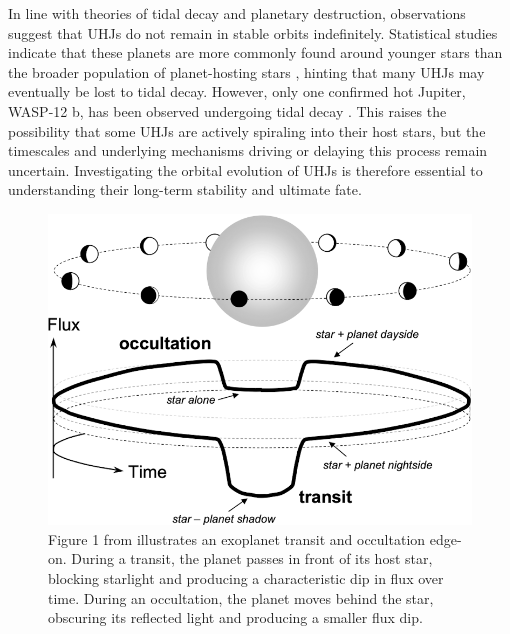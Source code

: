 \documentclass[oneside,12pt]{amsart}
\numberwithin{page}{section}
\begin{document}

In line with theories of tidal decay and planetary destruction, observations suggest that UHJs do not remain in stable orbits indefinitely. Statistical studies indicate that these planets are more commonly found around younger stars than the broader population of planet-hosting stars \citep{hamer2019hot}, hinting that many UHJs may eventually be lost to tidal decay. However, only one confirmed hot Jupiter, WASP-12 b, has been observed undergoing tidal decay \citep{yee2019orbit}. This raises the possibility that some UHJs are actively spiraling into their host stars, but the timescales and underlying mechanisms driving or delaying this process remain uncertain. Investigating the orbital evolution of UHJs is therefore essential to understanding their long-term stability and ultimate fate.

\begin{figure}[htbp]
    \centering
    \includegraphics[width=0.7\linewidth]{figs/winn_fig1.png}
    \caption{Figure 1 from \citet{winn2010transits} illustrates an exoplanet transit and occultation edge-on. During a transit, the planet passes in front of its host star, blocking starlight and producing a characteristic dip in flux over time. During an occultation, the planet moves behind the star, obscuring its reflected light and producing a smaller flux dip.}
    \label{fig:winnfig1}
\end{figure}
\end{document}
